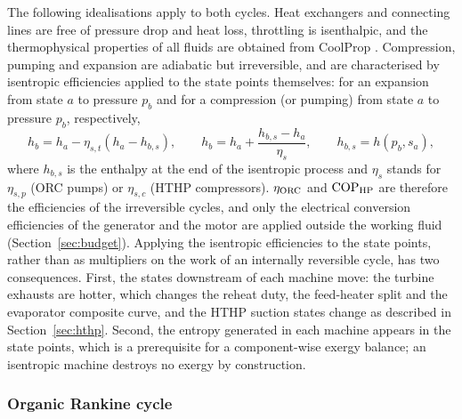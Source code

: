 The following idealisations apply to both cycles. Heat exchangers and
connecting lines are free of pressure drop and heat loss, throttling is
isenthalpic, and the thermophysical properties of all fluids are obtained from
CoolProp \cite{CoolProp}. Compression, pumping and expansion are adiabatic but
irreversible, and are characterised by isentropic efficiencies applied to the
state points themselves: for an expansion from state $a$ to pressure $p_b$
and for a compression (or pumping) from state $a$ to pressure $p_b$,
respectively,
\begin{equation}
  h_b=h_a-\eta_{s,t}\left(h_a-h_{b,s}\right),
  \qquad
  h_b=h_a+\frac{h_{b,s}-h_a}{\eta_{s}},
  \qquad
  h_{b,s}=h\left(p_b,s_a\right),
  \label{eq:eta-s}
\end{equation}
where $h_{b,s}$ is the enthalpy at the end of the isentropic process and
$\eta_{s}$ stands for $\eta_{s,p}$ (ORC pumps) or $\eta_{s,c}$ (HTHP
compressors). $\eta_{\mathrm{ORC}}$ and $\mathrm{COP}_{\mathrm{HP}}$ are therefore the efficiencies of the
irreversible cycles, and only the electrical conversion efficiencies of the
generator and the motor are applied outside the working fluid
(Section~\ref{sec:budget}). Applying the isentropic efficiencies to the state
points, rather than as multipliers on the work of an internally reversible
cycle, has two consequences. First, the states downstream of each machine
move: the turbine exhausts are hotter, which changes the reheat duty, the
feed-heater split and the evaporator composite curve, and the HTHP suction
states change as described in Section~\ref{sec:hthp}. Second, the entropy
generated in each machine appears in the state points, which is a
prerequisite for a component-wise exergy balance; an isentropic machine
destroys no exergy by construction. 

\subsubsection{Organic Rankine cycle}
\label{sec:orc}

